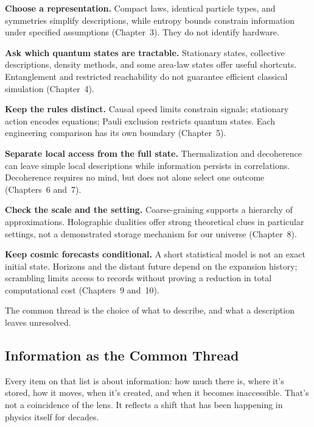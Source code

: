 \begin{compactchecklist}
\item \textbf{Choose a representation.} Compact laws, identical particle types, and symmetries simplify descriptions, while entropy bounds constrain information under specified assumptions (Chapter~3). They do not identify hardware.
\item \textbf{Ask which quantum states are tractable.} Stationary states, collective descriptions, density methods, and some area-law states offer useful shortcuts. Entanglement and restricted reachability do not guarantee efficient classical simulation (Chapter~4).
\item \textbf{Keep the rules distinct.} Causal speed limits constrain signals; stationary action encodes equations; Pauli exclusion restricts quantum states. Each engineering comparison has its own boundary (Chapter~5).
\item \textbf{Separate local access from the full state.} Thermalization and decoherence can leave simple local descriptions while information persists in correlations. Decoherence requires no mind, but does not alone select one outcome (Chapters~6 and~7).
\item \textbf{Check the scale and the setting.} Coarse-graining supports a hierarchy of approximations. Holographic dualities offer strong theoretical clues in particular settings, not a demonstrated storage mechanism for our universe (Chapter~8).
\item \textbf{Keep cosmic forecasts conditional.} A short statistical model is not an exact initial state. Horizons and the distant future depend on the expansion history; scrambling limits access to records without proving a reduction in total computational cost (Chapters~9 and~10).
\end{compactchecklist}

The common thread is the choice of what to describe, and what a description leaves unresolved.

\subsection{Information as the Common Thread}

Every item on that list is about information: how much there is, where it's stored, how it moves, when it's created, and when it becomes inaccessible. That's not a coincidence of the lens. It reflects a shift that has been happening in physics itself for decades.


